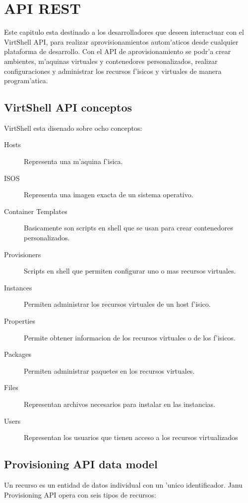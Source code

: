 \chapter{API REST}
\label{capapi}

Este capitulo esta destinado a los desarrolladores que deseen interactuar con el VirtShell API, para realizar aprovisionamientos autom'aticos desde cualquier plataforma de desarrollo. Con el API de aprovisionamiento se podr'a crear ambientes, m'aquinas virtuales y contenedores personalizados, realizar configuraciones y administrar los recursos f'isicos y virtuales de manera program'atica. 

\section{VirtShell API conceptos}
VirtShell esta disenado sobre ocho conceptos:

\begin{description}
\item [Hosts] Representa una m'aquina f'isica.
\item [ISOS] Representa una imagen exacta de un sistema operativo.
\item [Container Templates] Basicamente son scripts en shell que se usan para crear contenedores personalizados.
\item [Provisioners] Scripts en shell que permiten configurar uno o mas recursos virtuales.
\item [Instances] Permiten administrar los recursos virtuales de un host f'isico.
\item [Properties] Permite obtener informacion de los recursos virtuales o de los f'isicos.
\item [Packages] Permiten administrar paquetes en los recursos virtuales.
\item [Files] Representan archivos necesarios para instalar en las instancias.
\item [Users] Representan los usuarios que tienen acceso a los recursos virtualizados
\end{description}

\section{Provisioning API data model}
Un recurso es un entidad de datos individual con un 'unico identificador. Janu Provisioning API opera con seis tipos de recursos:


